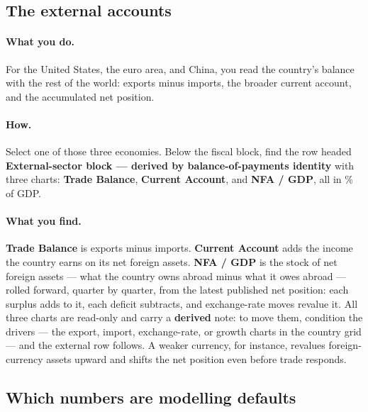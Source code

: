 \documentclass[11pt]{article}
\theoremstyle{definition}
\theoremstyle{remark}
\begin{document}
\subsection{The external accounts}

\paragraph{What you do.} For the United States, the euro area, and China, you read the
country's balance with the rest of the world: exports minus imports, the broader current
account, and the accumulated net position.

\paragraph{How.} Select one of those three economies. Below the fiscal block, find the row
headed \textbf{External-sector block --- derived by balance-of-payments identity} with three
charts: \textbf{Trade Balance}, \textbf{Current Account}, and \textbf{NFA / GDP}, all in \% of
GDP.

\paragraph{What you find.} \textbf{Trade Balance} is exports minus imports. \textbf{Current
Account} adds the income the country earns on its net foreign assets. \textbf{NFA / GDP} is
the stock of net foreign assets --- what the country owns abroad minus what it owes abroad ---
rolled forward, quarter by quarter, from the latest published net position: each surplus adds
to it, each deficit subtracts, and exchange-rate moves revalue it. All three charts are
read-only and carry a \textbf{derived} note: to move them, condition the drivers --- the
export, import, exchange-rate, or growth charts in the country grid --- and the external row
follows. A weaker currency, for instance, revalues foreign-currency assets upward and shifts
the net position even before trade responds.

\subsection{Which numbers are modelling defaults}
\end{document}
